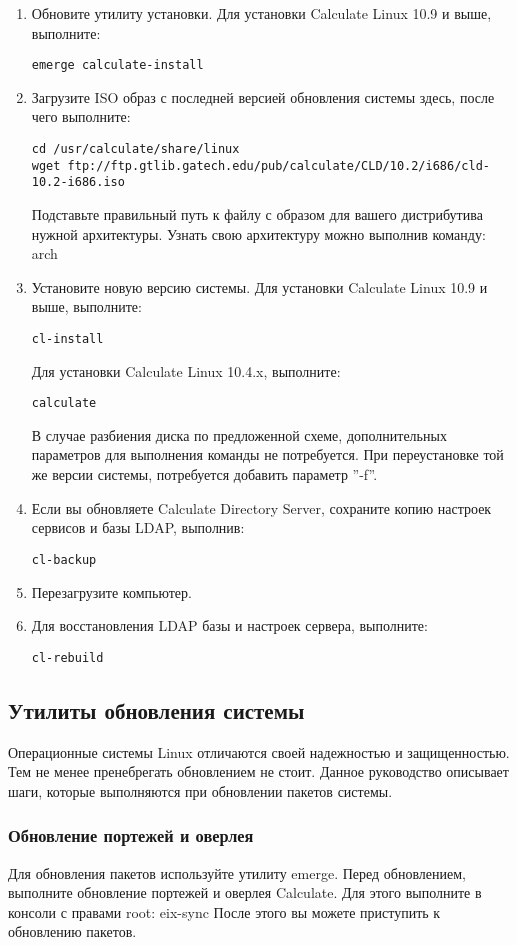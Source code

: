 \begin{enumerate}
\item Обновите утилиту установки. Для установки Calculate Linux 10.9 и выше, выполните:
\begin{verbatim}
emerge calculate-install
\end{verbatim}
\item Загрузите ISO образ с последней версией обновления системы здесь, после чего выполните:
\begin{verbatim}
cd /usr/calculate/share/linux
wget ftp://ftp.gtlib.gatech.edu/pub/calculate/CLD/10.2/i686/cld-10.2-i686.iso
\end{verbatim}
Подставьте правильный путь к файлу с образом для вашего дистрибутива нужной архитектуры. Узнать свою архитектуру можно выполнив команду:
arch
\item Установите новую версию системы. Для установки Calculate Linux 10.9 и выше, выполните:
\begin{verbatim}
cl-install
\end{verbatim}
Для установки Calculate Linux 10.4.x, выполните:
\begin{verbatim}
calculate
\end{verbatim}
В случае разбиения диска по предложенной схеме, дополнительных параметров для выполнения команды не потребуется. При переустановке той же версии системы, потребуется добавить параметр ''-f''.
\item Если вы обновляете Calculate Directory Server, сохраните копию настроек сервисов и базы LDAP, выполнив:
\begin{verbatim}
cl-backup
\end{verbatim}
\item Перезагрузите компьютер.
\item Для восстановления LDAP базы и настроек сервера, выполните:
\begin{verbatim}
cl-rebuild
\end{verbatim}
\end{enumerate}

\subsection{Утилиты обновления системы}
Операционные системы Linux отличаются своей надежностью и защищенностью. Тем не менее пренебрегать обновлением не стоит. Данное руководство описывает шаги, которые выполняются при обновлении пакетов системы.
\subsubsection{Обновление портежей и оверлея}
Для обновления пакетов используйте утилиту emerge. Перед обновлением, выполните обновление портежей и оверлея Calculate. Для этого выполните в консоли с правами root:
eix-sync
После этого вы можете приступить к обновлению пакетов.
